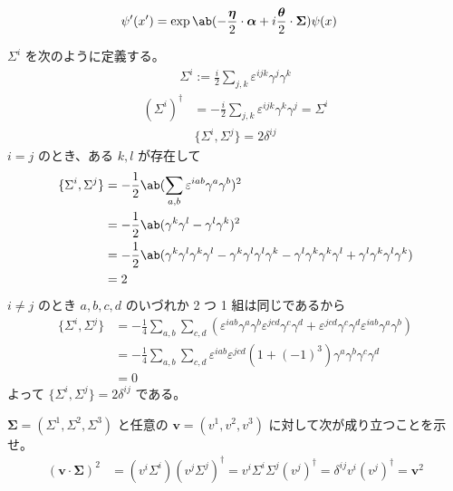 \documentclass[uplatex,dvipdfmx,a4paper,11pt]{jlreq}
\theoremstyle{definition}
\numberwithin{equation}{section}
\begin{document}
\begin{align}
  \psi'(x') & = \exp\ab(-\frac{\bm{\eta}}{2}\cdot\bm{\alpha} + i\frac{\bm{\theta}}{2}\cdot\bm{\Sigma})\psi(x)
\end{align}

$\Sigma^i$ を次のように定義する。
\begin{align}
  \Sigma^i := \frac{i}{2}\sum_{j,k}\varepsilon^{ijk}\gamma^j\gamma^k
\end{align}
\begin{align}
  (\Sigma^i)^\dagger & = -\frac{i}{2}\sum_{j,k}\varepsilon^{ijk}\gamma^k\gamma^j = \Sigma^i
\end{align}
\begin{align}
  \lbrace\Sigma^i, \Sigma^j\rbrace = 2\delta^{ij}
\end{align}
$i = j$ のとき、ある $k, l$ が存在して
\begin{align}
  \lbrace\Sigma^i, \Sigma^j\rbrace & = -\frac{1}{2}\ab(\sum_{a,b}\varepsilon^{iab}\gamma^a\gamma^b)^2                                                                                             \\
                                   & = -\frac{1}{2}\ab(\gamma^k\gamma^l - \gamma^l\gamma^k)^2                                                                                                     \\
                                   & = -\frac{1}{2}\ab(\gamma^k\gamma^l\gamma^k\gamma^l - \gamma^k\gamma^l\gamma^l\gamma^k - \gamma^l\gamma^k\gamma^k\gamma^l + \gamma^l\gamma^k\gamma^l\gamma^k) \\
                                   & = 2
\end{align}
$i \neq j$ のとき $a, b, c, d$ のいづれか 2 つ 1 組は同じであるから
\begin{align}
  \lbrace\Sigma^i, \Sigma^j\rbrace & = -\frac{1}{4}\sum_{a,b}\sum_{c,d}(\varepsilon^{iab}\gamma^a\gamma^b\varepsilon^{jcd}\gamma^c\gamma^d + \varepsilon^{jcd}\gamma^c\gamma^d\varepsilon^{iab}\gamma^a\gamma^b) \\
                                   & = -\frac{1}{4}\sum_{a,b}\sum_{c,d}\varepsilon^{iab}\varepsilon^{jcd}(1 + (-1)^3)\gamma^a\gamma^b\gamma^c\gamma^d                                                            \\
                                   & = 0
\end{align}
よって $\lbrace\Sigma^i, \Sigma^j\rbrace = 2\delta^{ij}$ である。

$\bm{\Sigma} = (\Sigma^1, \Sigma^2, \Sigma^3)$ と任意の $\bm{v} = (v^1, v^2, v^3)$ に対して次が成り立つことを示せ。
\begin{align}
  (\bm{v}\cdot\bm{\Sigma})^2 & = (v^i\Sigma^i)(v^j\Sigma^j)^\dagger = v^i\Sigma^i\Sigma^j(v^j)^\dagger = \delta^{ij}v^i(v^j)^\dagger = \bm{v}^2
\end{align}
\end{document}
